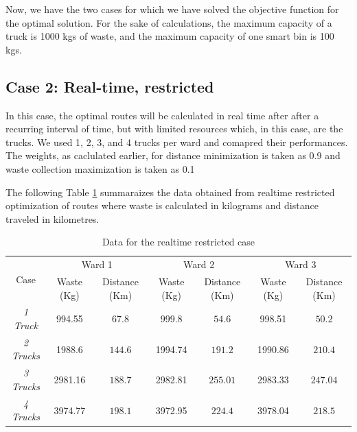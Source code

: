\documentclass[12pt]{article}
\begin{document}
Now, we have the two cases for which we have solved the objective function for the optimal solution. For the sake of calculations, the maximum capacity of a truck is 1000 kgs of waste, and the maximum capacity of one smart bin is 100 kgs.

\subsection*{Case 2: Real-time, restricted}
In this case, the optimal routes will be calculated in real time after after a recurring interval of time, but with limited resources which, in this case, are the trucks. We used 1, 2, 3, and 4 trucks per ward and comapred their performances. The weights, as caclulated earlier, for distance minimization is taken as 0.9 and waste collection maximization is taken as 0.1

The following Table \ref{tab1} summaraizes the data obtained from realtime restricted optimization of routes where waste is calculated in kilograms and distance traveled in kilometres.
\begin{table}[H]
    \centering
    \caption{Data for the realtime restricted case} \label{tab1}
    \vspace*{0.3cm}
    \begin{tabular}{|c|c|c|c|c|c|c|}
        \hline \multirow{2}{*}{Case} & \multicolumn{2}{c|}{Ward 1} & \multicolumn{2}{c|}{Ward 2} & \multicolumn{2}{c|}{Ward 3}\\
        \cline{2-7}& Waste (Kg)  & Distance (Km) & Waste (Kg) & Distance (Km) & Waste (Kg) & Distance (Km)\\ 
        \hline \textit{1 Truck} & 994.55 & $67.8$ & 999.8 & $54.6$ & 998.51 & $50.2$ \\
        \hline \textit{2 Trucks} & 1988.6 & $144.6$ & 1994.74 & $191.2$ & 1990.86 & $210.4$ \\
        \hline \textit{3 Trucks} & 2981.16 & $188.7$ & 2982.81 & $255.01$ & 2983.33 & $247.04$ \\
        \hline \textit{4 Trucks} & 3974.77 & $198.1$ & 3972.95 & $224.4$ & 3978.04 & $218.5$ \\
        \hline
    \end{tabular}
\end{table}
\end{document}

